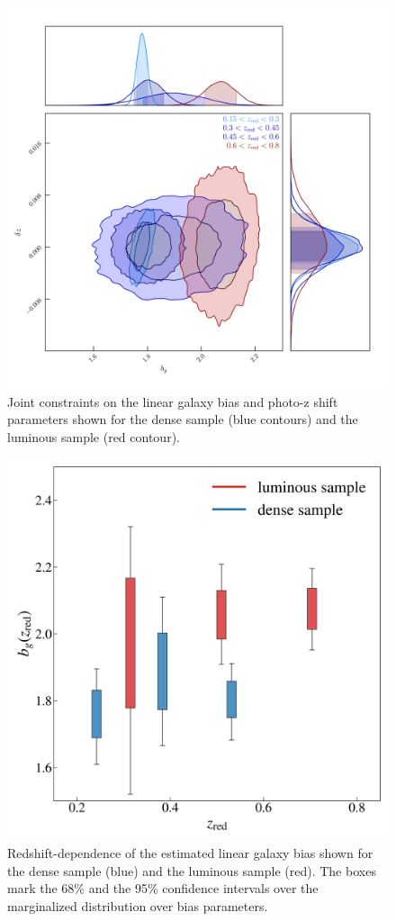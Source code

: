 \documentclass[fleqn,usenatbib,useAMS]{mnras}
\begin{document}
\begin{figure}
\includegraphics[width=\columnwidth]{figures_tmp/joint_estimate_converged.png}
\caption{\label{fig:joint_estimate} Joint constraints on the linear galaxy bias and photo-z shift parameters shown for the dense sample (blue contours) and the luminous sample (red contour). } 
\end{figure}

\begin{figure}
\includegraphics[width=\columnwidth]{figures_tmp/b_estimate_boxed.png}
\caption{\label{fig:b_estimate} Redshift-dependence of the estimated linear galaxy bias shown for the dense sample (blue) and the luminous sample (red). The boxes mark the 68\% and the 95\% confidence intervals over the marginalized distribution over bias parameters.} 
\end{figure}
\end{document}
